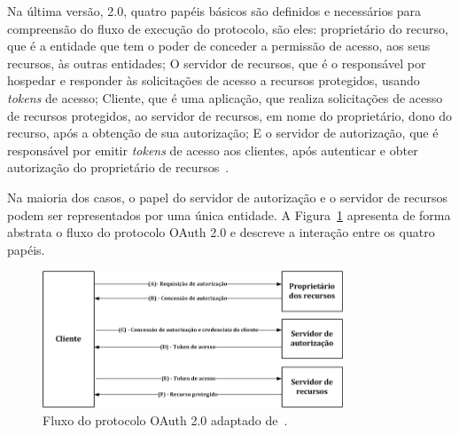 Na última versão, 2.0, quatro papéis básicos são definidos e necessários para compreensão do fluxo de execução do protocolo, são eles: proprietário do recurso, que é a entidade que tem o poder de conceder a permissão de acesso, aos seus recursos, às outras entidades; O servidor de recursos, que é o responsável por hospedar e responder às solicitações de acesso a recursos protegidos, usando \emph{tokens} de acesso; Cliente, que é uma aplicação, que realiza solicitações de acesso de recursos protegidos, ao servidor de recursos, em nome do proprietário, dono do recurso, após a obtenção de sua autorização; E o servidor de autorização, que é responsável por emitir \emph{tokens} de acesso aos clientes, após autenticar e obter autorização do proprietário de recursos~\cite{rfc6749}.






Na maioria dos casos, o papel do servidor de autorização e o servidor de recursos podem  ser representados por uma única entidade. A Figura~\ref{fig:diagramaoauth} apresenta de forma abstrata o fluxo do protocolo OAuth 2.0 e descreve a interação entre os quatro papéis.

\begin{figure}[!htb]
\centering
\includegraphics[width=0.8\textwidth]{diagrama_oauth2.png}
\caption{Fluxo do protocolo OAuth 2.0 adaptado de~\cite{rfc6749}.}
\label{fig:diagramaoauth}
\end{figure}

